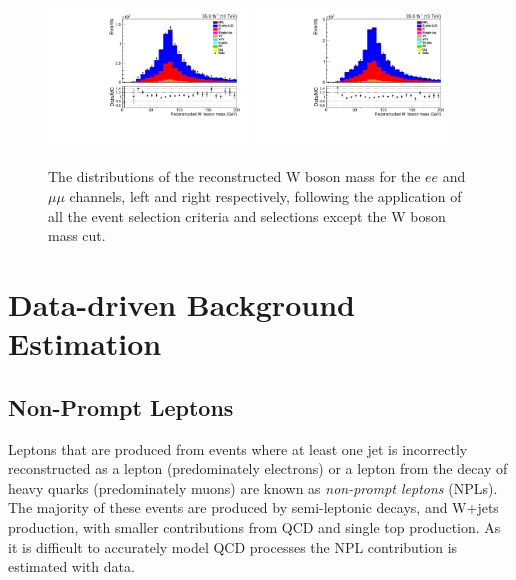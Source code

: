 \begin{figure}[h]
\centering
\includegraphics[width=0.47\textwidth]{figs/background-estimation/plots/unblinded/prompt_ee_ttbarInc/wPairMass_NPL_ee_bTag_ee.pdf}
\includegraphics[width=0.47\textwidth]{figs/background-estimation/plots/unblinded/prompt_mumu_ttbarInc/wPairMass_NPL_mumu_bTag_mumu.pdf}
\caption{
The distributions of the reconstructed W boson mass for the $ee$ and $\mu\mu$ channels, left and right respectively, following the application of all the event selection criteria and selections except the W boson mass cut.
}
\label{fig:SR_wBoson}
\end{figure}

\section{Data-driven Background Estimation}\label{sec:dataDrivenBackground}

\subsection{Non-Prompt Leptons}\label{sec:NPLs}
Leptons that are produced from events where at least one jet is incorrectly reconstructed as a lepton (predominately electrons) or a lepton from the decay of heavy quarks (predominately muons) are known as \emph{non-prompt leptons} (NPLs).
The majority of these events are produced by semi-leptonic \ttbar decays, and W+jets production, with smaller contributions from QCD and single top production.
As it is difficult to accurately model QCD processes the NPL contribution is estimated with data.

